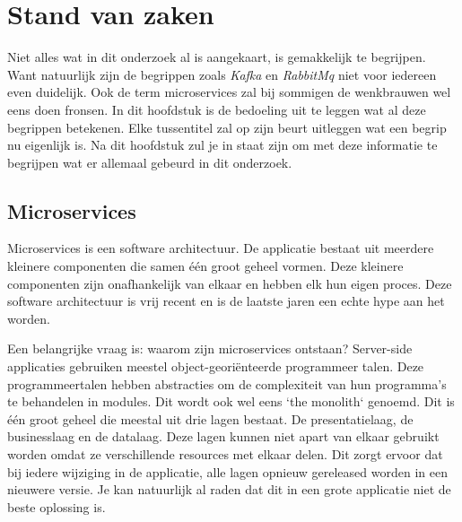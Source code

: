 \chapter{Stand van zaken}
\label{ch:stand-van-zaken}

Niet alles wat in dit onderzoek al is aangekaart, is gemakkelijk te begrijpen. Want natuurlijk zijn de begrippen zoals \emph{Kafka} en \emph{RabbitMq} niet voor iedereen even duidelijk. Ook de term microservices zal bij sommigen de wenkbrauwen wel eens doen fronsen. In dit hoofdstuk is de bedoeling uit te leggen wat al deze begrippen betekenen. Elke tussentitel zal op zijn beurt uitleggen wat een begrip nu eigenlijk is. Na dit hoofdstuk zul je in staat zijn om met deze informatie te begrijpen wat er allemaal gebeurd in dit onderzoek.
\section{Microservices}

Microservices is een software architectuur. De applicatie bestaat uit meerdere kleinere componenten die samen één groot geheel vormen. Deze kleinere componenten zijn onafhankelijk van elkaar en hebben elk hun eigen proces. Deze software architectuur is vrij recent en is de laatste jaren een echte hype aan het worden.

Een belangrijke vraag is: waarom zijn microservices ontstaan? Server-side applicaties gebruiken meestel object-georiënteerde programmeer talen. Deze programmeertalen hebben abstracties om de complexiteit van hun programma's te behandelen in modules. Dit wordt ook wel eens `the monolith` genoemd. Dit is één groot geheel die meestal uit drie lagen bestaat. De presentatielaag, de businesslaag en de datalaag. Deze lagen kunnen niet apart van elkaar gebruikt worden omdat ze verschillende resources met elkaar delen. Dit zorgt ervoor dat bij iedere wijziging in de applicatie, alle lagen opnieuw gereleased worden in een nieuwere versie. Je kan natuurlijk al raden dat dit in een grote applicatie niet de beste oplossing is. 

